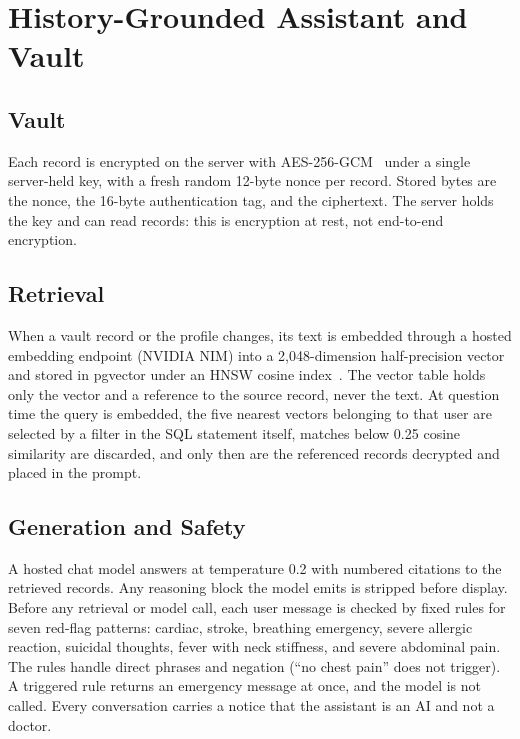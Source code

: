 \documentclass[conference]{IEEEtran}
\begin{document}
\section{History-Grounded Assistant and Vault}

\subsection{Vault}

Each record is encrypted on the server with AES-256-GCM~\cite{dworkin2007} under a single server-held key, with a fresh random 12-byte nonce per record. Stored bytes are the nonce, the 16-byte authentication tag, and the ciphertext. The server holds the key and can read records: this is encryption at rest, not end-to-end encryption.

\subsection{Retrieval}

When a vault record or the profile changes, its text is embedded through a hosted embedding endpoint (NVIDIA NIM) into a 2,048-dimension half-precision vector and stored in pgvector under an HNSW cosine index~\cite{malkov2020}. The vector table holds only the vector and a reference to the source record, never the text. At question time the query is embedded, the five nearest vectors belonging to that user are selected by a filter in the SQL statement itself, matches below 0.25 cosine similarity are discarded, and only then are the referenced records decrypted and placed in the prompt.

\subsection{Generation and Safety}

A hosted chat model answers at temperature 0.2 with numbered citations to the retrieved records. Any reasoning block the model emits is stripped before display. Before any retrieval or model call, each user message is checked by fixed rules for seven red-flag patterns: cardiac, stroke, breathing emergency, severe allergic reaction, suicidal thoughts, fever with neck stiffness, and severe abdominal pain. The rules handle direct phrases and negation (``no chest pain'' does not trigger). A triggered rule returns an emergency message at once, and the model is not called. Every conversation carries a notice that the assistant is an AI and not a doctor.
\end{document}
